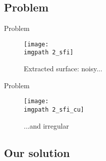 \subsection{Problem}

\renewcommand{\imgWidth}{1\linewidth}

\begin{frame}{Problem}
 \begin{center}
 \begin{figure}[H]
	\begin{minipage}[b]{\imgWidth}
            	\centering
            	\texttt{[image: \\imgpath 2\_sfi]}
		\caption*{Extracted surface: noisy...}
	\end{minipage}
 \end{figure}
 \end{center}
\end{frame}


\renewcommand{\imgWidth}{1\linewidth}

\begin{frame}{Problem}
 \begin{center}
 \begin{figure}[H]
	\begin{minipage}[b]{\imgWidth}
            	\centering
            	\texttt{[image: \\imgpath 2\_sfi\_cu]}
		\caption*{...and irregular}
	\end{minipage}
 \end{figure}
 \end{center}
\end{frame}

\subsection{Our solution}

